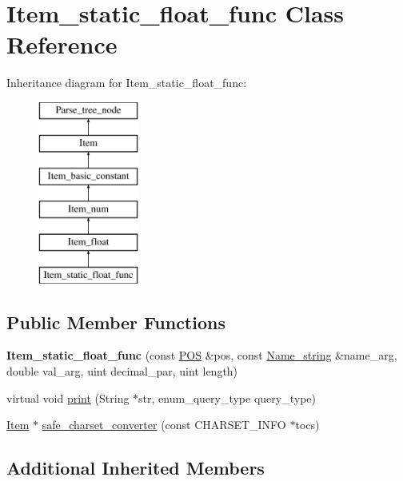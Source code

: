 \hypertarget{classItem__static__float__func}{}\section{Item\+\_\+static\+\_\+float\+\_\+func Class Reference}
\label{classItem__static__float__func}
Inheritance diagram for Item\+\_\+static\+\_\+float\+\_\+func\+:\begin{figure}[H]
\begin{center}
\leavevmode
\includegraphics[height=6.000000cm]{classItem__static__float__func}
\end{center}
\end{figure}
\subsection*{Public Member Functions}
\begin{DoxyCompactItemize}
\item 
\mbox{\label{classItem__static__float__func_ab444ef526d5808ce803feddbf00fd6f8}} 
{\bfseries Item\+\_\+static\+\_\+float\+\_\+func} (const \mbox{\hyperlink{structYYLTYPE}{P\+OS}} \&pos, const \mbox{\hyperlink{className__string}{Name\+\_\+string}} \&name\+\_\+arg, double val\+\_\+arg, uint decimal\+\_\+par, uint length)
\item 
virtual void \mbox{\hyperlink{classItem__static__float__func_a01626caaf912493b016fc9b0d8eb7349}{print}} (String $\ast$str, enum\+\_\+query\+\_\+type query\+\_\+type)
\item 
\mbox{\hyperlink{classItem}{Item}} $\ast$ \mbox{\hyperlink{classItem__static__float__func_a9a61341166a21bae1b91976041ccbd52}{safe\+\_\+charset\+\_\+converter}} (const C\+H\+A\+R\+S\+E\+T\+\_\+\+I\+N\+FO $\ast$tocs)
\end{DoxyCompactItemize}
\subsection*{Additional Inherited Members}


